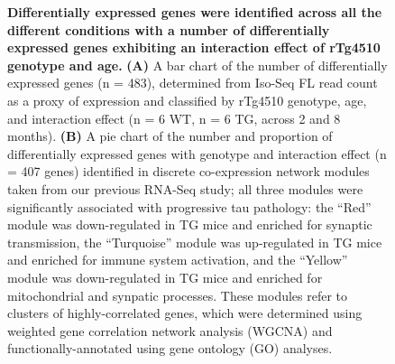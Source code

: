 \begin{figure}[h]
	{\textbf{Differentially expressed genes were identified across all the different conditions with a number of differentially expressed genes exhibiting an interaction effect of rTg4510 genotype and age.} \textbf{(A)} A bar chart of the number of differentially expressed genes (n = 483), determined from Iso-Seq FL read count as a proxy of expression and classified by rTg4510 genotype, age, and interaction effect (n = 6 WT, n = 6 TG, across 2 and 8 months). \textbf{(B)} A pie chart of the number and proportion of differentially expressed genes with genotype and interaction effect (n = 407 genes) identified in discrete co-expression network modules taken from our previous RNA-Seq study\cite{Castanho2020}; all three modules were significantly associated with progressive tau pathology: the “Red” module was down-regulated in TG mice and enriched for synaptic transmission, the “Turquoise” module was up-regulated in TG mice and enriched for immune system activation, and the “Yellow” module was down-regulated in TG mice and enriched for mitochondrial and synpatic processes. These modules refer to clusters of highly-correlated genes, which were determined using weighted gene correlation network analysis (WGCNA)\cite{Langfelder2008} and functionally-annotated using gene ontology (GO) analyses\cite{Young2010}.}    
	\label{fig:dea_model_num}
\end{figure}



